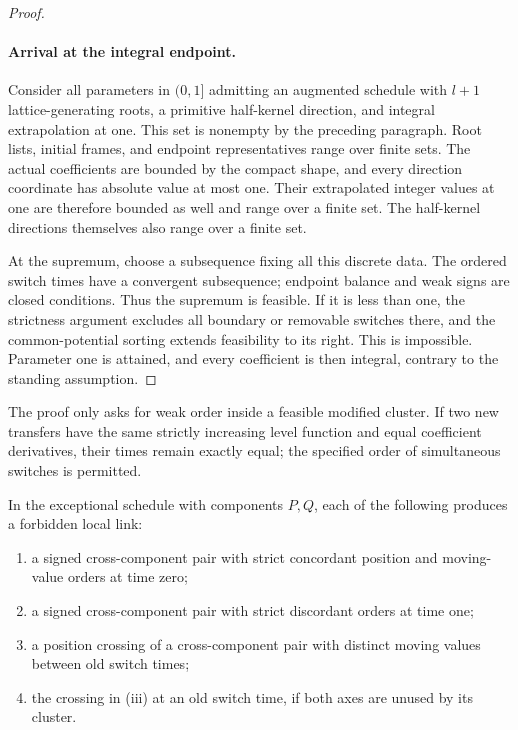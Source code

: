 \begin{proof}
\paragraph{Arrival at the integral endpoint.}
Consider all parameters in \((0,1]\) admitting an augmented schedule
with \(l+1\) lattice-generating roots, a primitive half-kernel
direction, and integral extrapolation at one.  This set is nonempty by
the preceding paragraph.  Root lists, initial frames, and endpoint
representatives range over finite sets.  The actual coefficients are
bounded by the compact shape, and every direction coordinate has
absolute value at most one.  Their extrapolated integer values at one
are therefore bounded as well and range over a finite set.  The
half-kernel directions themselves also range over a finite set.

At the supremum, choose a subsequence fixing all this discrete data.
The ordered switch times have a convergent subsequence; endpoint
balance and weak signs are closed conditions.  Thus the supremum is
feasible.  If it is less than one, the strictness argument excludes
all boundary or removable switches there, and the common-potential
sorting extends feasibility to its right.  This is impossible.
Parameter one is attained, and every coefficient is then integral,
contrary to the standing assumption.
\end{proof}

The proof only asks for weak order inside a feasible modified cluster.
If two new transfers have the same strictly increasing level function
and equal coefficient derivatives, their times remain exactly equal;
the specified order of simultaneous switches is permitted.

\begin{lemma}\label{lem:direct-links}
In the exceptional schedule with components \(P,Q\), each of the
following produces a forbidden local link:
\begin{enumerate}[label=\textup{(\roman*)}]
\item a signed cross-component pair with strict concordant position
and moving-value orders at time zero;
\item a signed cross-component pair with strict discordant orders at
time one;
\item a position crossing of a cross-component pair with distinct
moving values between old switch times;
\item the crossing in \textup{(iii)} at an old switch time, if both
axes are unused by its cluster.
\end{enumerate}
\end{lemma}

